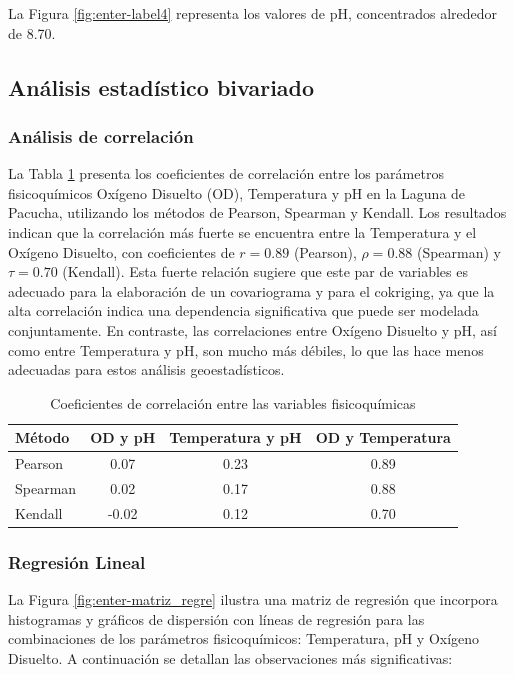 La Figura \ref{fig:enter-label4} representa los valores de pH, concentrados alrededor de 8.70.

\subsection{Análisis estadístico bivariado}
 \subsubsection{Análisis de correlación }

 La Tabla \ref{tab:correlation} presenta los coeficientes de correlación entre los parámetros fisicoquímicos Oxígeno Disuelto (OD), Temperatura y pH en la Laguna de Pacucha, utilizando los métodos de Pearson, Spearman y Kendall. Los resultados indican que la correlación más fuerte se encuentra entre la Temperatura y el Oxígeno Disuelto, con coeficientes de \(r = 0.89\) (Pearson), \(\rho = 0.88\) (Spearman) y \(\tau = 0.70\) (Kendall). Esta fuerte relación sugiere que este par de variables es adecuado para la elaboración de un covariograma y para el cokriging, ya que la alta correlación indica una dependencia significativa que puede ser modelada conjuntamente. En contraste, las correlaciones entre Oxígeno Disuelto y pH, así como entre Temperatura y pH, son mucho más débiles, lo que las hace menos adecuadas para estos análisis geoestadísticos.

\begin{table}[!htb]
\centering 
\caption{Coeficientes de correlación entre las variables fisicoquímicas}
\label{tab:correlation}
\begin{tabular}{@{}lccc@{}}
\toprule
Método & OD y pH & Temperatura y pH & OD y Temperatura \\ \midrule
Pearson & 0.07 & 0.23 & 0.89 \\
Spearman & 0.02 & 0.17 & 0.88 \\
Kendall & -0.02 & 0.12 & 0.70 \\ \bottomrule
\end{tabular}
\end{table}

\subsubsection{Regresión Lineal}


La Figura \ref{fig:enter-matriz_regre} ilustra una matriz de regresión que incorpora histogramas y gráficos de dispersión con líneas de regresión para las combinaciones de los parámetros fisicoquímicos: Temperatura, pH y Oxígeno Disuelto. A continuación se detallan las observaciones más significativas:

